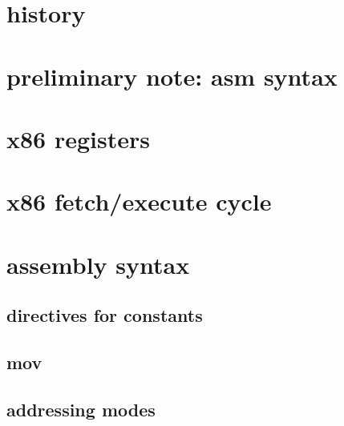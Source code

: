 
\begin{frame}
    \titlepage
\end{frame}

\section{history}





\section{preliminary note: asm syntax}



\section{x86 registers}




\section{x86 fetch/execute cycle}



\section{assembly syntax}

\subsection{directives for constants}



\subsection{mov}



\subsection{addressing modes}

